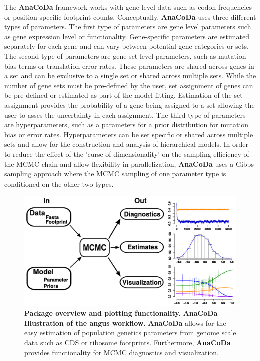 \documentclass{bioinfo}
\newcommand{\package}{\textbf{AnaCoDa }} %
\begin{document}
The \package framework works with gene level data such as codon frequencies or position specific footprint counts.
Conceptually, \package uses three different types of parameters.
The first type of parameters are gene level parameters such as gene expression level or functionality.
Gene-specific parameters are estimated separately for each gene and can vary between potential gene categories or sets.
The second type of parameters are gene set level parameters, such as mutation bias terms or translation error rates.
These parameters are shared across genes in a set and can be exclusive to a single set or shared across multiple sets.
While the number of gene sets must be pre-defined by the user, set assignment of genes can be pre-defined or estimated as part of the model fitting.
Estimation of the set assignment provides the probability of a gene being assigned to a set allowing the user to asses the uncertainty in each assignment.
The third type of parameters are hyperparameters, such as a parameters for a prior distribution for mutation bias or error rates.
Hyperparameters can be set specific or shared across multiple sets and allow for the construction and analysis of hierarchical models.
In order to reduce the effect of the 'curse of dimensionality' on the sampling efficiency of the MCMC chain and allow flexibility in parallelization, \package uses a Gibbs sampling approach where the MCMC sampling of one parameter type is conditioned on the other two types.


\begin{figure}[!tpb]
\centering
 \includegraphics[width=5in]{workflow_croped.pdf}
\vspace{-0.2cm}
\caption{\textbf{Package overview and plotting functionality.} \package \textbf{Illustration of the angus workflow.} 
\package allows for the easy estimation of population genetics parameters from genome scale data such as CDS or ribosome footprints. 
Furthermore, \package provides functionality for MCMC diagnostics and visualization. 
}
\label{fig:plotbin}
\end{figure}
\end{document}

